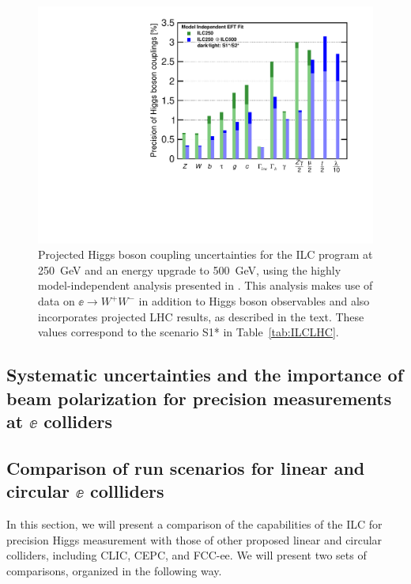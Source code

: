 \begin{figure}
\begin{center}
\includegraphics[width=0.85\hsize]{chapters/figures/ModelindepSummary.pdf}
\caption{Projected Higgs boson coupling uncertainties for the ILC
  program at 250~GeV and an energy upgrade to 500~GeV, using the
  highly model-independent analysis presented in \cite{Fujii:2017vwa}. This
  analysis makes use of  data on $\ee\to W^+W^-$ in addition to Higgs
  boson observables and also incorporates projected LHC results, as described
  in the text.  These
values correspond to the  scenario S1* in Table~\ref{tab:ILCLHC}.}
\label{fig:ILCmodelindep}
\end{center}
\end{figure}
%


\subsection{Systematic uncertainties and the importance of beam polarization for precision measurements at $\ee$  colliders}
\label{subsec:polarization}



\subsection{Comparison of run scenarios for linear and circular $\ee$ collliders}
\label{subsec:lincirc}



In this section, we will present a comparison of the capabilities of the ILC for precision Higgs measurement with those of other proposed linear and circular colliders, including CLIC, CEPC, and FCC-ee.  We will present two sets of comparisons, organized in the following way.

